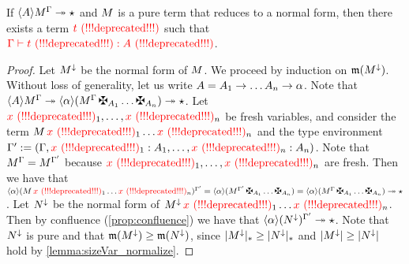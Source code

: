 \begin{theorem}[Completeness]
\label{thm:completeness}
If $\langle A\rangle M^{\Gamma} \twoheadrightarrow \star$
and $M$ is a pure term that reduces to a normal form,
then there exists a term $\textcolor{red}{t \text{\,\,(!!!deprecated!!!)}}$ such that $\textcolor{red}{\Gamma\vdash\textcolor{red}{t \text{\,\,(!!!deprecated!!!)}}:A \text{\,\,(!!!deprecated!!!)}}$.
\end{theorem}
\begin{proof}
Let $M^\downarrow$ be the normal form of $M$.
We proceed by induction on $\mathfrak{m}(M^\downarrow)$.
Without loss of generality, let us write
$A = A_1 \to \hdots A_n \to \alpha$.
Note that
$\verif{\typ}{\subs{\utm}{\tenv}}
 \tos \verif{\btyp}{(\subs{\utm}{\tenv}\,\gen{\typ_1}\hdots\gen{\typ_n})}
 \tos \iunit$.
Let $\textcolor{red}{x \text{\,\,(!!!deprecated!!!)}}_1,\hdots,\textcolor{red}{x \text{\,\,(!!!deprecated!!!)}}_n$ be fresh variables,
and consider the term $M\,\textcolor{red}{x \text{\,\,(!!!deprecated!!!)}}_1\hdots\textcolor{red}{x \text{\,\,(!!!deprecated!!!)}}_n$
and the type environment $\Gamma' := (\Gamma,\textcolor{red}{x \text{\,\,(!!!deprecated!!!)}}_1:A_1,\hdots,\textcolor{red}{x \text{\,\,(!!!deprecated!!!)}}_n:A_n)$.
Note that $M^{\Gamma} = M^{\Gamma'}$ because $\textcolor{red}{x \text{\,\,(!!!deprecated!!!)}}_1,\hdots,\textcolor{red}{x \text{\,\,(!!!deprecated!!!)}}_n$
are fresh.
Then we have that
$\verif{\btyp}{\subs{(\utm\,\var_1\hdots\var_n)}{\tenvtwo}}
= \verif{\btyp}{(\subs{\utm}{\tenvtwo}\,\gen{\typ_1}\hdots\gen{\typ_n})}
= \verif{\btyp}{(\subs{\utm}{\tenv}\,\gen{\typ_1}\hdots\gen{\typ_n})}
\tos \iunit$.
Let $N^\downarrow$ be the normal form of $M^\downarrow\,\textcolor{red}{x \text{\,\,(!!!deprecated!!!)}}_1\hdots\textcolor{red}{x \text{\,\,(!!!deprecated!!!)}}_n$.
Then by confluence (\cref{prop:confluence})
we have that
$\langle\alpha\rangle(N^\downarrow)^{\Gamma'} \twoheadrightarrow \star$.
Note that $N^\downarrow$ is pure and
that $\mathfrak{m}(M^\downarrow) \geq \mathfrak{m}(N^\downarrow)$,
since $\lvert M^\downarrow\rvert_* \geq \lvert N^\downarrow\rvert_*$
and $\lvert M^\downarrow\rvert \geq \lvert N^\downarrow\rvert$
hold by \cref{lemma:sizeVar_normalize}.


\end{proof}
